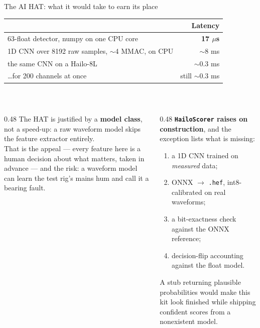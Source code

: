\documentclass[aspectratio=169,10pt]{beamer}
\begin{document}
\begin{frame}{The AI HAT: what it would take to earn its place}
  \centering
  \scriptsize
  \begin{tabular}{@{}lr@{}}
    \toprule
    & \textbf{Latency} \\
    \midrule
    63-float detector, numpy on one CPU core            & \textbf{17 $\mu$s} \\
    1D CNN over 8192 raw samples, $\sim$4 MMAC, on CPU  & $\sim$8 ms \\
    the same CNN on a Hailo-8L                          & $\sim$0.3 ms \\
    \quad \ldots for 200 channels at once               & still $\sim$0.3 ms \\
    \bottomrule
  \end{tabular}
  \\[3mm]
  \begin{columns}[T]
    \begin{column}{0.48\textwidth}
      \scriptsize
      The HAT is justified by a \textbf{model class}, not a speed-up: a raw
      waveform model skips the feature extractor entirely.
      \\[1mm]
      That is the appeal --- every feature here is a human decision about what
      matters, taken in advance --- and the risk: a waveform model can learn
      the test rig's mains hum and call it a bearing fault.
    \end{column}
    \begin{column}{0.48\textwidth}
      \scriptsize
      \textbf{\texttt{HailoScorer} raises on construction}, and the exception
      lists what is missing:
      \begin{enumerate}\itemsep0.5pt
        \item a 1D CNN trained on \emph{measured} data;
        \item ONNX $\rightarrow$ \texttt{.hef}, int8-calibrated on real
              waveforms;
        \item a bit-exactness check against the ONNX reference;
        \item decision-flip accounting against the float model.
      \end{enumerate}
      \color{pdmcrit}
      A stub returning plausible probabilities would make this kit look
      finished while shipping confident scores from a nonexistent model.
    \end{column}
  \end{columns}
\end{frame}
\end{document}

